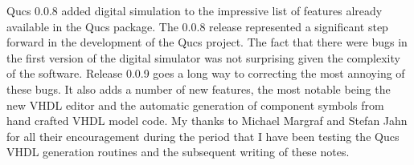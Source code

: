 
Qucs 0.0.8 added digital simulation to the impressive list of features
already available in the Qucs package.  The 0.0.8 release represented
a significant step forward in the development of the Qucs project.
The fact that there were bugs in the first version of the digital
simulator was not surprising given the complexity of the software.
Release 0.0.9 goes a long way to correcting the most annoying of these
bugs.  It also adds a number of new features, the most notable being
the new VHDL editor and the automatic generation of component symbols
from hand crafted VHDL model code. My thanks to Michael Margraf and
Stefan Jahn for all their encouragement during the period that I have
been testing the Qucs VHDL generation routines and the subsequent
writing of these notes.

